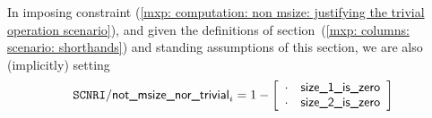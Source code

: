 \saNote{}
In imposing constraint (\ref{mxp: computation: non msize: justifying the trivial operation scenario}),
and given the definitions of section~(\ref{mxp: columns: scenario: shorthands}) and standing assumptions of this section,
we are also (implicitly) setting
\[
	\texttt{SCNRI}\textsf{/}{\textsf{not\_msize\_nor\_trivial}} _{i} = 1 -
	\left[ \begin{array}{cr}
		\cdot & \textsf{size\_1\_is\_zero} \\
		\cdot & \textsf{size\_2\_is\_zero} \\
	\end{array} \right]
\]

% 
